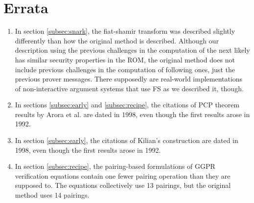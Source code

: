 \section*{Errata}
\begin{enumerate}
    \item In section \ref{subsec:snark}, the fiat-shamir transform was described slightly differently than how the original method is described. Although our description using the previous challenges in the computation of the next likely has similar security properties in the ROM, the original method does not include previous challenges in the computation of following ones, just the previous prover messages. There supposedly are real-world implementations of non-interactive argument systems that use FS as we described it, though.\\

    \item In sections \ref{subsec:early} and \ref{subsec:recipe}, the citations of PCP theorem results by Arora et al. are dated in 1998, even though the first results arose in 1992.\\ 

    \item In section \ref{subsec:early}, the citations of Kilian's construction are dated in 1998, even though the first results arose in 1992. \\

    \item In section \ref{subsec:recipe}, the pairing-based formulations of GGPR verification equations contain one fewer pairing operation than they are supposed to. The equations collectively use 13 pairings, but the original method uses 14 pairings.
    
\end{enumerate}
